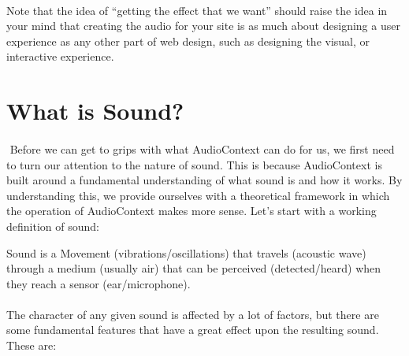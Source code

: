 \paragraph{} Note that the idea of ``getting the effect that we want'' should raise the idea in your mind that creating the audio for your site is as much about designing a user experience as any other part of web design, such as designing the visual, or interactive experience.


\section{What is Sound?}
\paragraph{} Before we can get to grips with what AudioContext can do for us, we first need to turn our attention to the nature of sound. This is because AudioContext is built around a fundamental understanding of what sound is and how it works. By understanding this, we provide ourselves with a theoretical framework in which the operation of AudioContext makes more sense. Let's start with a working definition of sound:

\begin{framed}
Sound is a Movement (vibrations/oscillations) that travels (acoustic wave) through a medium (usually air) that can be perceived (detected/heard) when they reach a sensor (ear/microphone).
\end{framed}

\paragraph{} The character of any given sound is affected by a lot of factors, but there are some fundamental features that have a great effect upon the resulting sound. These are:

